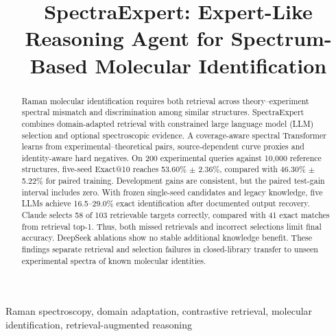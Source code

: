 \documentclass[conference]{IEEEtran}
\begin{document}
\title{SpectraExpert: Expert-Like Reasoning Agent for Spectrum-Based Molecular Identification}
\author{



}


\maketitle


\begin{abstract}
Raman molecular identification requires both retrieval across theory--experiment spectral mismatch and discrimination among similar structures. SpectraExpert combines domain-adapted retrieval with constrained large language model (LLM) selection and optional spectroscopic evidence. A coverage-aware spectral Transformer learns from experimental--theoretical pairs, source-dependent curve proxies and identity-aware hard negatives. On 200 experimental queries against 10,000 reference structures, five-seed Exact@10 reaches 53.60\% $\pm$ 2.36\%, compared with 46.30\% $\pm$ 5.22\% for paired training. Development gains are consistent, but the paired test-gain interval includes zero. With frozen single-seed candidates and legacy knowledge, five LLMs achieve 16.5--29.0\% exact identification after documented output recovery. Claude selects 58 of 103 retrievable targets correctly, compared with 41 exact matches from retrieval top-1. Thus, both missed retrievals and incorrect selections limit final accuracy. DeepSeek ablations show no stable additional knowledge benefit. These findings separate retrieval and selection failures in closed-library transfer to unseen experimental spectra of known molecular identities.
\end{abstract}
\begin{IEEEkeywords}
Raman spectroscopy, domain adaptation, contrastive retrieval, molecular identification, retrieval-augmented reasoning
\end{IEEEkeywords}
\end{document}
